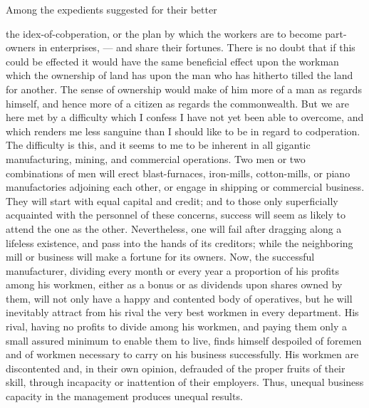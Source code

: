 \documentclass[11pt,openany]{book}
\begin{document}
Among the expedients suggested for their better

the idex-of-cobperation, or the plan by which the workers are to become part-owners in enterprises, --- and share their fortunes. There is no doubt that if this could be effected it would have the same beneficial effect upon the workman which the ownership of land has upon the man who has hitherto tilled the land for another. The sense of ownership would make of him more of a man as regards himself, and hence more of a citizen as regards the commonwealth. But we are here met by a difficulty which I confess I have not yet been able to overcome, and which renders me less sanguine than I should like to be in regard to codperation. The difficulty is this, and it seems to me to be inherent in all gigantic manufacturing, mining, and commercial operations. Two men or two combinations of men will erect blast-furnaces, iron-mills, cotton-mills, or piano manufactories adjoining each other, or engage in shipping or commercial business. They will start with equal capital and credit; and to those only superficially acquainted with the personnel of these concerns, success will seem as likely to attend the one as the other. Nevertheless, one will fail after dragging along a lifeless existence, and pass into the hands of its creditors; while the neighboring mill or business will make a fortune for its owners. Now, the successful manufacturer, dividing every month or every year a proportion of his profits among his workmen, either as a bonus or as dividends upon shares owned by them, will not only have a happy and contented body of operatives, but he will inevitably attract from his rival the very best workmen in every department. His rival, having no profits to divide among his workmen, and paying them only a small assured minimum to enable them to live, finds himself despoiled of foremen and of workmen necessary to carry on his business successfully. His workmen are discontented and, in their own opinion, defrauded of the proper fruits of their skill, through incapacity or inattention of their employers. Thus, unequal business capacity in the management produces unequal results.
\end{document}

